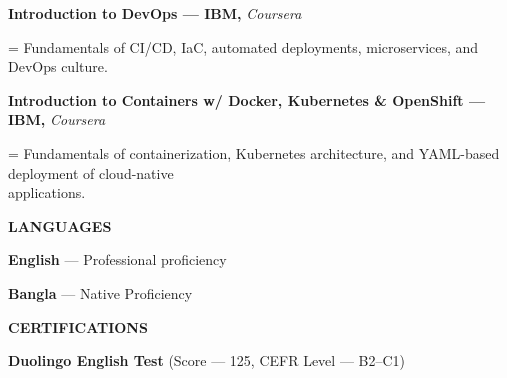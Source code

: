 \documentclass[a4paper]{article}
\newcommand{\sectionfont}{%
  \fontsize{12pt}{14pt}\selectfont\bfseries
}
\newlength{\secondaryindent}
\newcommand{\sectiontitle}[1]{%
  \par
  \vspace{14pt}
  {\sectionfont #1}\par
  \vspace{6pt}
}
\newcommand{\secondaryline}[1]{%
  \par
  \begingroup
  \leftskip=\secondaryindent
  \noindent
  #1\par
  \endgroup
}
\newcommand{\course}[2]{%
  \textbf{#1 --- IBM, }\textit{Coursera}\par
  \secondaryline{#2}%
}
\begin{document}
\course
{Introduction to DevOps}
{Fundamentals of CI/CD, IaC, automated deployments, microservices, and DevOps culture.}

\vspace{6pt}

\course
{Introduction to Containers w/ Docker, Kubernetes \& OpenShift}
{Fundamentals of containerization, Kubernetes architecture, and YAML-based deployment of cloud-native\\
  applications.}


\sectiontitle{LANGUAGES}

\textbf{English} --- Professional proficiency\par

\textbf{Bangla} --- Native Proficiency\par


\sectiontitle{CERTIFICATIONS}

\textbf{Duolingo English Test}
(Score --- 125, CEFR Level --- B2--C1)
\end{document}
